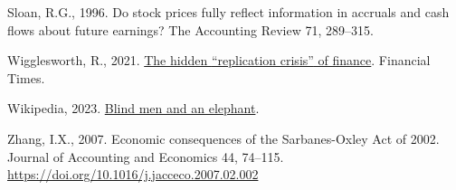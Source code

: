 \documentclass[
  letterpaper,
  DIV=11,
  numbers=noendperiod]{scrartcl}
\newlength{\cslhangindent}
\newlength{\cslentryspacingunit} %
\newenvironment{CSLReferences}[2] %
 {%
  \setlength{\parindent}{0pt}
  \ifodd #1
  \let\oldpar\par
  \def\par{\hangindent=\cslhangindent\oldpar}
  \fi
  \setlength{\parskip}{#2\cslentryspacingunit}
 }%
 {}
\begin{document}
\begin{CSLReferences}{1}{0}
\leavevmode{}%
Sloan, R.G., 1996. Do stock prices fully reflect information in accruals
and cash flows about future earnings? The Accounting Review 71,
289--315.

\leavevmode{}%
Wigglesworth, R., 2021.
\href{https://www.ft.com/content/9025393f-76da-4b8f-9436-4341485c75d0?shareType=nongift}{The
hidden {``replication crisis''} of finance}. Financial Times.

\leavevmode{}%
Wikipedia, 2023.
\href{https://en.wikipedia.org/wiki/Blind_men_and_an_elephant}{Blind men
and an elephant}.

\leavevmode{}%
Zhang, I.X., 2007. Economic consequences of the {Sarbanes-Oxley Act} of
2002. Journal of Accounting and Economics 44, 74--115.
\url{https://doi.org/10.1016/j.jacceco.2007.02.002}

\end{CSLReferences}
\end{document}
